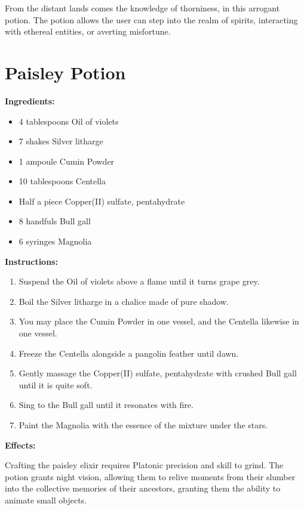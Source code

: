 \documentclass{article}
\begin{document}
From the distant lands comes the knowledge of thorniness, in this arrogant potion. The potion allows the user can step into the realm of spirits, interacting with ethereal entities, or averting misfortune.

\newpage
\section*{Paisley Potion}

\textbf{Ingredients:}

\begin{itemize}
  \item 4 tablespoons Oil of violets
  \item 7 shakes Silver litharge
  \item 1 ampoule Cumin Powder
  \item 10 tablespoons Centella
  \item Half a piece Copper(II) sulfate, pentahydrate
  \item 8 handfuls Bull gall
  \item 6 syringes Magnolia
\end{itemize}

\textbf{Instructions:}

\begin{enumerate}
  \item Suspend the Oil of violets above a flame until it turns grape grey.
  \item Boil the Silver litharge in a chalice made of pure shadow.
  \item You may place the Cumin Powder in one vessel, and the Centella likewise in one vessel.
  \item Freeze the Centella alongside a pangolin feather until dawn.
  \item Gently massage the Copper(II) sulfate, pentahydrate with crushed Bull gall until it is quite soft.
  \item Sing to the Bull gall until it resonates with fire.
  \item Paint the Magnolia with the essence of the mixture under the stars.
\end{enumerate}

\textbf{Effects:}

Crafting the paisley elixir requires Platonic precision and skill to grind. The potion grants night vision, allowing them to relive moments from their slumber into the collective memories of their ancestors, granting them the ability to animate small objects.
\end{document}
